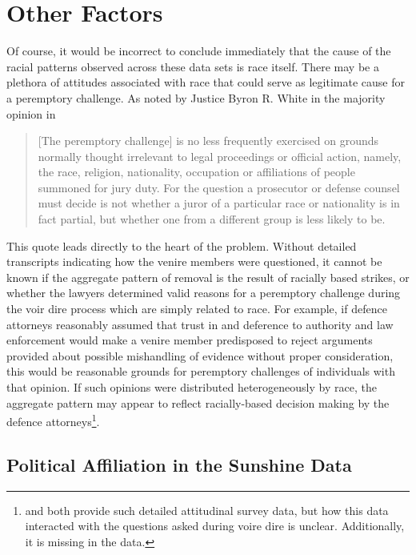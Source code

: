 \section{Other Factors} \label{sec:otherfact}

Of course, it would be incorrect to conclude immediately that the cause of the racial patterns observed across these data sets is
race itself. There may be a plethora of attitudes associated with race that could serve as legitimate cause for a peremptory
challenge. As noted by Justice Byron R. White in the majority opinion in \cite{swainvalabama}

\begin{quote}
  [The peremptory challenge] is no less frequently exercised on grounds normally thought irrelevant to legal proceedings or
  official action, namely, the race, religion, nationality, occupation or affiliations of people summoned for jury duty. For the
  question a prosecutor or defense counsel must decide is not whether a juror of a particular race or nationality is in fact
  partial, but whether one from a different group is less likely to be.
\end{quote}

This quote leads directly to the heart of the problem. Without detailed transcripts indicating how the venire members were
questioned, it cannot be known if the aggregate pattern of removal is the result of racially based strikes, or whether the lawyers
determined valid reasons for a peremptory challenge during the voir dire process which are simply related to race. For example, if
defence attorneys reasonably assumed that trust in and deference to authority and law enforcement would make a venire member
predisposed to reject arguments provided about possible mishandling of evidence without proper consideration, this would be
reasonable grounds for peremptory challenges of individuals with that opinion. If such opinions were distributed heterogeneously
by race, the aggregate pattern may appear to reflect racially-based decision making by the defence
attorneys\footnote{\cite{StubbornLegacy} and \cite{PerempChalMurder} both provide such detailed attitudinal survey data, but how
  this data interacted with the questions asked during voire dire is unclear. Additionally, it is missing in the
  \cite{JurySunshineProj} data.}. 

\subsection{Political Affiliation in the Sunshine Data}

